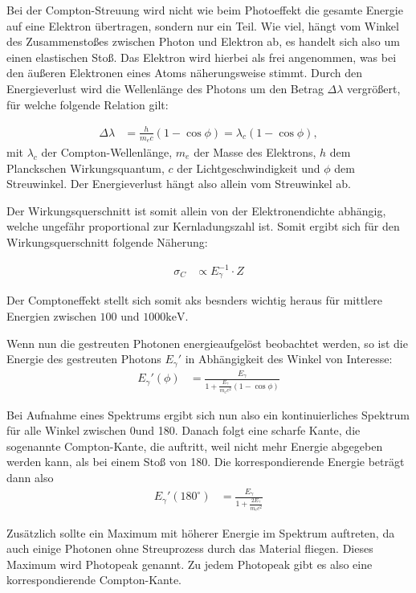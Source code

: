 \documentclass[
	parskip=half,10pt,
	numbers= noenddot, %
	toc=flat, %
	oneside,
	twocolumn,
	]{scrartcl}
\begin{document}
Bei der Compton-Streuung wird nicht wie beim Photoeffekt die gesamte Energie auf eine Elektron übertragen, sondern nur ein Teil. Wie viel, hängt vom Winkel des 
Zusammenstoßes zwischen Photon und Elektron ab, es handelt sich also um einen elastischen Stoß. Das Elektron wird hierbei als frei angenommen, was bei den 
äußeren Elektronen eines Atoms näherungsweise stimmt. Durch den Energieverlust wird die Wellenlänge des Photons um den Betrag $\Delta \lambda$ vergrößert, für 
welche folgende Relation gilt:

\begin{align}
\Delta \lambda &= \frac{h}{m_e c} (1 - \cos \phi) = \lambda_c (1 - \cos \phi),
\end{align}
mit $\lambda_c$ der Compton-Wellenlänge, $m_e$ der Masse des Elektrons, $h$ dem Planckschen Wirkungsquantum, $c$ der Lichtgeschwindigkeit und $\phi$ dem Streuwinkel. 
Der Energieverlust hängt also allein vom Streuwinkel ab. 

Der Wirkungsquerschnitt ist somit allein von der Elektronendichte abhängig, welche ungefähr proportional zur Kernladungszahl ist. Somit ergibt sich für 
den Wirkungsquerschnitt folgende Näherung: 

\begin{align}
\sigma_C &\propto E_{\gamma}^{-1} \cdot Z
\end{align}

Der Comptoneffekt stellt sich somit aks besnders wichtig heraus für mittlere Energien zwischen $100$ und $1000 \si{\kilo \electronvolt}$. 

Wenn nun die gestreuten Photonen energieaufgelöst beobachtet werden, so ist die Energie des gestreuten Photons $E_{\gamma}'$ in Abhängigkeit des Winkel von Interesse:
\begin{align}
E_{\gamma}'(\phi) &= \frac{E_{\gamma}}{1 + \frac{E_{\gamma}}{m_e c^2} (1 - \cos \phi)}
\end{align}

Bei Aufnahme eines Spektrums ergibt sich nun also ein kontinuierliches Spektrum für alle Winkel zwischen 0\textdegree und 180\textdegree. Danach folgt eine 
scharfe Kante, die sogenannte Compton-Kante, die auftritt, weil nicht mehr Energie abgegeben werden kann, als bei einem Stoß von 180\textdegree. Die 
korrespondierende Energie beträgt dann also 
\begin{align}
E_{\gamma}'(180^{\circ}) &= \frac{E_{\gamma}}{1 + \frac{2 E_{\gamma}}{m_e c^2}}
\end{align}

Zusätzlich sollte ein Maximum mit höherer Energie im Spektrum auftreten, da auch einige Photonen ohne Streuprozess durch das Material fliegen. Dieses Maximum wird 
Photopeak genannt. Zu jedem Photopeak gibt es also eine korrespondierende Compton-Kante. 
\end{document}
